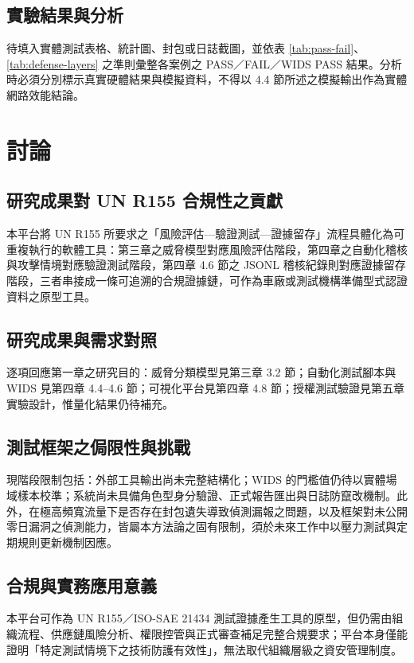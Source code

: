 \documentclass[12pt,a4paper,oneside]{report}
\begin{document}
\section{實驗結果與分析}
待填入實體測試表格、統計圖、封包或日誌截圖，並依表 \ref{tab:pass-fail}、\ref{tab:defense-layers} 之準則彙整各案例之 PASS／FAIL／WIDS PASS 結果。分析時必須分別標示真實硬體結果與模擬資料，不得以 4.4 節所述之模擬輸出作為實體網路效能結論。

\chapter{討論}

\section{研究成果對 UN R155 合規性之貢獻}
本平台將 UN R155 所要求之「風險評估—驗證測試—證據留存」流程具體化為可重複執行的軟體工具：第三章之威脅模型對應風險評估階段，第四章之自動化稽核與攻擊情境對應驗證測試階段，第四章 4.6 節之 JSONL 稽核紀錄則對應證據留存階段，三者串接成一條可追溯的合規證據鏈，可作為車廠或測試機構準備型式認證資料之原型工具。

\section{研究成果與需求對照}
逐項回應第一章之研究目的：威脅分類模型見第三章 3.2 節；自動化測試腳本與 WIDS 見第四章 4.4--4.6 節；可視化平台見第四章 4.8 節；授權測試驗證見第五章實驗設計，惟量化結果仍待補充。

\section{測試框架之侷限性與挑戰}
現階段限制包括：外部工具輸出尚未完整結構化；WIDS 的門檻值仍待以實體場域樣本校準；系統尚未具備角色型身分驗證、正式報告匯出與日誌防竄改機制。此外，在極高頻寬流量下是否存在封包遺失導致偵測漏報之問題，以及框架對未公開零日漏洞之偵測能力，皆屬本方法論之固有限制，須於未來工作中以壓力測試與定期規則更新機制因應。

\section{合規與實務應用意義}
本平台可作為 UN R155／ISO-SAE 21434 測試證據產生工具的原型，但仍需由組織流程、供應鏈風險分析、權限控管與正式審查補足完整合規要求；平台本身僅能證明「特定測試情境下之技術防護有效性」，無法取代組織層級之資安管理制度。
\end{document}
